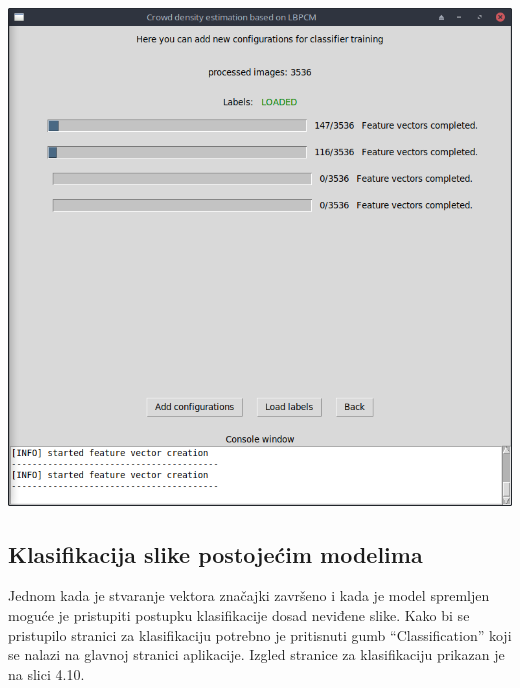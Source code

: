 \documentclass[times, utf8, zavrsni]{fer}
\begin{document}
\begin{minipage}{\linewidth}
\centering
\includegraphics[scale=0.4]{img/fvc3.png}
\end{minipage}

\subsection{Klasifikacija slike postojećim modelima}

Jednom kada je stvaranje vektora značajki završeno i kada je model spremljen 
moguće je pristupiti postupku klasifikacije dosad neviđene slike. 
Kako bi se pristupilo stranici za klasifikaciju potrebno je 
pritisnuti gumb \enquote{Classification} koji se nalazi na glavnoj 
stranici aplikacije. Izgled stranice za klasifikaciju prikazan je na 
slici 4.10.
\end{document}
